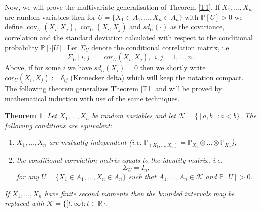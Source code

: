 \documentclass[sn-mathphys,Numbered,11pt]{sn-jnl}%
\theoremstyle{thmstyleone}%
\newtheorem{theorem}{Theorem}%
\newcommand{\R}{\mathbb{R}}
\newcommand{\PP}{\mathbb{P}}
\newcommand{\KK}{\mathcal{K}}
\newcommand{\cov}{\operatorname{cov}}
\newcommand{\cor}{\operatorname{cor}}
\begin{document}
\bigskip
Now, we will prove the multivariate generalisation of Theorem \ref{T1}. If  $X_1,\dots,X_n$ are random variables then for $U=\{X_1\in A_1,\dots,X_n\in A_n\}$ with $\PP[U]>0$ we define
$\cov_U(X_i,X_j)$, $\cor_U(X_i,X_j)$ and $sd_U(\cdot )$ as the covariance, correlation and the standard deviation calculated with respect to the conditional probability $\PP[\cdot|U]$. Let $\Sigma_U$ denote the conditional 
correlation matrix, i.e. 
$$\Sigma_U[i,j]=cor_U(X_i,X_j),\ \ i,j=1,\dots,n.$$
Above, if for some $i$ we have $sd_U(X_i)=0$ then we  shortly write $cor_U(X_i,X_j):=\delta_{ij}$ (Kronecker delta) which will keep the notation compact. The following theorem generalizes Theorem \ref{T1} and will be proved by mathematical induction with use of the same techniques.  \\
\begin{theorem}\label{T2}
Let $X_1,\dots,X_n$ be random variables and let $\KK=\{[a,b]\colon a<b\}$.
 The following conditions are equivalent:
\begin{enumerate}
\item $X_1,\dots,X_n$ are mutually independent (i.e. $\PP_{(X_1,\dots,X_n)}=\PP_{X_1}\otimes\dots\otimes\PP_{X_n}$),
\item the conditional correlation matrix equals to the identity matrix, i.e.
$$\Sigma_U=I_n,$$
 for any $U=\{X_1\in A_1,\dots,X_n\in A_n\}$ such that $A_1,\dots,A_n\in \KK$ and $\PP[U]>0$.
\end{enumerate}
If $X_1,\dots,X_n$ have finite second moments then the bounded intervals may be replaced  with $\KK=\{[t,\infty)\colon t\in\R\}$.
\end{theorem}
\end{document}
